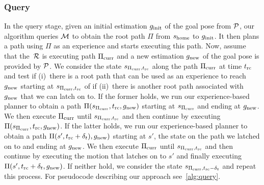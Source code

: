 \documentclass[conference]{IEEEtran}
\begin{document}
\subsubsection{Query}
In the query stage, given an initial estimation $g_{\rm init}$ of the goal pose from $\mathcal{P}$, our algorithm queries $\mathcal{M}$ to obtain the root path $\Pi$ from $s_{\textrm{home}}$ to $g_{\rm init}$.
It then plans a path using $\Pi$ as an experience and starts executing this path.
%
Now, assume that the~$\mathcal{R}$ is executing path $\Pi_{\rm curr}$ and a new estimation $g_{\rm new}$ of the goal pose is provided by $\mathcal{P}$.
%
We consider the state $s_{\Pi_{\rm curr}, t_{\textrm{rc}}}$ along the path $\Pi_{\rm curr}$ at time $t_{\textrm{rc}}$ and test if
(i)~there is a root path that can be used as an experience to reach $g_{\rm new}$ starting at $s_{\Pi_{\rm curr}, t_{\textrm{rc}}}$
of if 
(ii)~there is another root path associated with~$g_{\rm new}$ that we can latch on to.
If the former holds, we run our experience-based planner to obtain a path $\Pi(s_{\Pi_{\rm curr}}, t_{\textrm{rc}}, g_{\rm new})$ starting at $s_{\Pi_{\rm curr}}$ and ending at $g_{\rm new}$. We then execute $\Pi_{\rm curr}$ until $s_{\Pi_{\rm curr}, t_{\textrm{rc}}}$ and then continue by executing $\Pi(s_{\Pi_{\rm curr}}, t_{\textrm{rc}}, g_{\rm new})$.
%
If the latter holds, we run our experience-based planner to obtain a path $\Pi(s', t_{\textrm{rc}} + \delta_t), g_{\rm new})$ starting at $s'$, the state on the path we latched on to and ending at $g_{\rm new}$. We then execute $\Pi_{\rm curr}$ until $s_{\Pi_{\rm curr}, t_{\textrm{rc}}}$ and then continue by executing the motion that latches on to $s'$ and finally executing  $\Pi(s', t_{\textrm{rc}} + \delta_t, g_{\rm new})$.
%
If neither hold, we consider the state $s_{\Pi_{\rm curr}, t_{\textrm{rc}}-\delta_t}$ and repeat this process.
%
For pseudocode describing our approach see~\ref{alg:query}.
\end{document}
